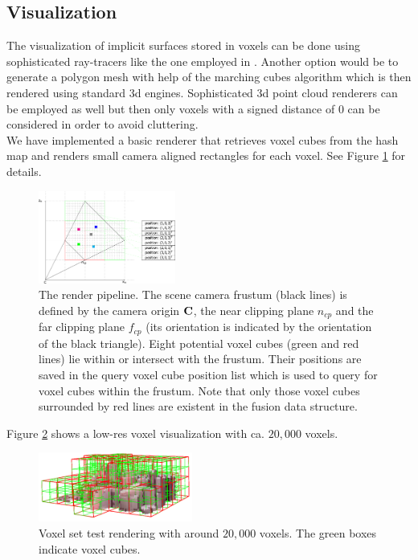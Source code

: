 \documentclass[conference]{IEEEtran}
\newcommand{\sco}[1]{\uppercase{\mathbf{#1}}}
\begin{document}
\subsection {Visualization}
\label{ch:vis}
The visualization of implicit surfaces stored in voxels can be done using sophisticated ray-tracers like the one employed in \cite{Graber2011b}. 
Another option would be to generate a polygon mesh with help of the marching cubes algorithm \cite{Lorensen1987} which is then rendered using standard 3d engines.
Sophisticated 3d point cloud renderers can be employed as well but then only voxels with a signed distance of $0$ can be considered in order to avoid cluttering.
\\
We have implemented a basic renderer that retrieves voxel cubes from the hash map and renders small camera aligned rectangles for each voxel. 
See Figure \ref{fig:renderpipe1} for details.
\begin{figure}[!htbp]
	\centering
	\includegraphics[width=0.40\textwidth]{figures/renderpipe1}
	\caption{
		The render pipeline.
		The scene camera frustum (black lines) is defined by the camera origin $\sco{C}$, the near clipping plane $n_{cp}$ and the far clipping plane $f_{cp}$ (its orientation is indicated by the orientation of the black triangle). 
		Eight potential voxel cubes (green and red lines) lie within or intersect with the frustum. 
		Their positions are saved in the query voxel cube position list which is used to query for voxel cubes within the frustum.  
		Note that only those voxel cubes surrounded by red lines are existent in the fusion data structure.  
	}
	\label{fig:renderpipe1}
\end{figure} 
Figure \ref{fig:rendering} shows a low-res voxel visualization with ca. $20,000$ voxels.
\begin{figure}[!htbp]
	\centering
	\includegraphics[width=0.45\textwidth]{figures/rendering.png}
	\caption{
		Voxel set test rendering with around $20,000$ voxels. The green boxes indicate voxel cubes. 
	}
	\label{fig:rendering}
\end{figure} 
\end{document}
